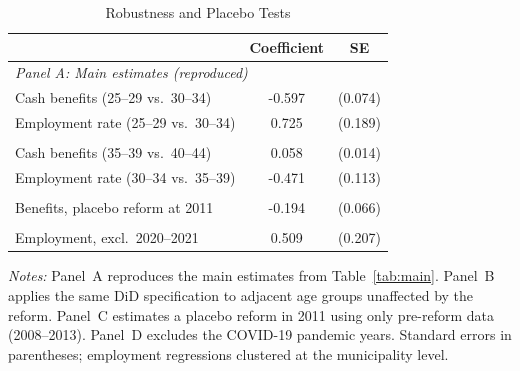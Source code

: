\begin{table}[htbp]
\centering
\caption{Robustness and Placebo Tests}
\label{tab:robust}
\begin{tabular}{lcc}
\toprule
 & Coefficient & SE \\
\midrule
\multicolumn{3}{l}{\textit{Panel A: Main estimates (reproduced)}} \\
Cash benefits (25--29 vs.\ 30--34) & -0.597 & (0.074) \\
Employment rate (25--29 vs.\ 30--34) & 0.725 & (0.189) \\
\addlinespace
\multicolumn{3}{l}{\textit{Panel B: Placebo age groups}} \\
Cash benefits (35--39 vs.\ 40--44) & 0.058 & (0.014) \\
Employment rate (30--34 vs.\ 35--39) & -0.471 & (0.113) \\
\addlinespace
\multicolumn{3}{l}{\textit{Panel C: Temporal placebo}} \\
Benefits, placebo reform at 2011 & -0.194 & (0.066) \\
\addlinespace
\multicolumn{3}{l}{\textit{Panel D: Sensitivity}} \\
Employment, excl.\ 2020--2021 & 0.509 & (0.207) \\
\bottomrule
\end{tabular}
\begin{tablenotes}
\item \textit{Notes:} Panel~A reproduces the main estimates from Table~\ref{tab:main}. Panel~B applies the same DiD specification to adjacent age groups unaffected by the reform. Panel~C estimates a placebo reform in 2011 using only pre-reform data (2008--2013). Panel~D excludes the COVID-19 pandemic years. Standard errors in parentheses; employment regressions clustered at the municipality level.
\end{tablenotes}
\end{table}

